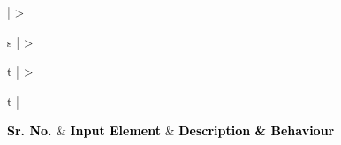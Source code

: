 \documentclass[hidelinks,a4paper,12pt]{article}
\begin{document}
\begin{center}
	{
	\setlength{\extrarowheight}{2pt}

	\newcolumntype{b}{X}
		
	\renewcommand\thetable{2} 					
	 \label{table:2}
	\vspace{0.25cm}
									
	\begin{tabularx}{\textwidth}{ | >{\ttfamily\raggedright\arraybackslash} s 
	| >{\ttfamily\raggedright\arraybackslash} t 
	| >{\ttfamily\raggedright\arraybackslash} t | }
								
	\hline
								
	{\textbf{\textcolor{black}{{Sr. No.} \newline}}} & {\textbf{\textcolor{black}{{Input Element}}}} & \textbf{\textcolor{black}{{Description \& Behaviour}}} \\
								

\end{tabularx}}
\end{center}
\end{document}

